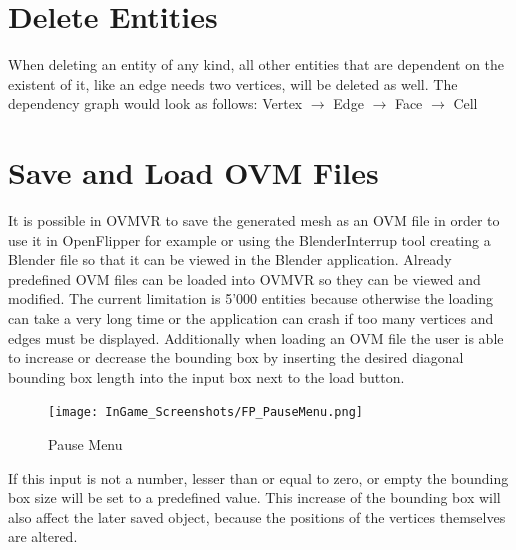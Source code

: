 \documentclass{report}
\begin{document}
	\closesection
	
	\section{Delete Entities}
	\startsection
		When deleting an entity of any kind, all other entities that are dependent on the existent of it, like an edge needs two vertices, will be deleted as well. The dependency graph would look as follows:
		\startsubsection
			Vertex $\rightarrow$ Edge $\rightarrow$ Face $\rightarrow$ Cell
		\closesection
	\closesection
	
	\section{Save and Load OVM Files}
	\startsection
		It is possible in OVMVR to save the generated mesh as an OVM file in order to use it in OpenFlipper for example or using the BlenderInterrup tool creating a Blender file so that it can be viewed in the Blender application. Already predefined OVM files can be loaded into OVMVR so they can be viewed and modified. The current limitation is 5'000 entities because otherwise the loading can take a very long time or the application can crash if too many vertices and edges must be displayed. Additionally when loading an OVM file the user is able to increase or decrease the bounding box by inserting the desired diagonal bounding box length into the input box next to the load button.
		\begin{figure}[H]
			\begin{center}
				\texttt{[image: InGame\_Screenshots/FP\_PauseMenu.png]}
				\caption{Pause Menu}
			\end{center}
		\end{figure}
		\noindent If this input is not a number, lesser than or equal to zero, or empty the bounding box size will be set to a predefined value. This increase of the bounding box will also affect the later saved object, because the positions of the vertices themselves are altered.
	\closesection
	
\end{document}
